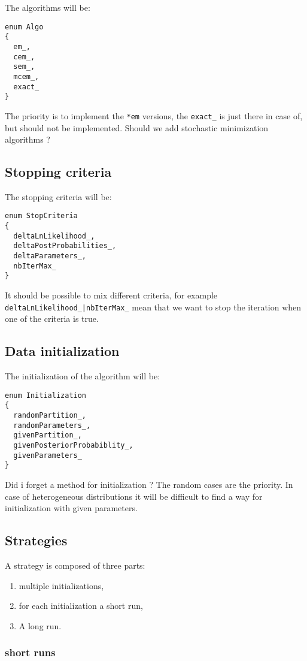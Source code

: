 \documentclass[a4paper,11pt]{article}
\begin{document}
The algorithms will be:
\begin{verbatim}
enum Algo
{
  em_,
  cem_,
  sem_,
  mcem_,
  exact_
}
\end{verbatim}

The priority is to implement the \verb+*em+ versions, the \verb+exact_+ is just there in case of, but
should not be implemented. Should we add stochastic minimization algorithms ?

\subsection{Stopping criteria}

The stopping criteria will be:
\begin{verbatim}
enum StopCriteria
{
  deltaLnLikelihood_,
  deltaPostProbabilities_,
  deltaParameters_,
  nbIterMax_
}
\end{verbatim}
It should be possible to mix different criteria, for example
\verb+deltaLnLikelihood_|nbIterMax_+ mean that we want to stop the iteration when one
of the criteria is true.

\subsection{Data initialization}

The initialization of the algorithm will be:
\begin{verbatim}
enum Initialization
{
  randomPartition_,
  randomParameters_,
  givenPartition_,
  givenPosteriorProbabiblity_,
  givenParameters_
}
\end{verbatim}

Did i forget a method for initialization ? The random cases are the priority.
In case of heterogeneous distributions it will be difficult to find a way for initialization with
given parameters.

\subsection{Strategies}

A strategy is composed of three parts:
\begin{enumerate}
  \item multiple initializations,
  \item for each initialization a short run,
  \item A long run.
\end{enumerate}

\subsubsection{short runs}
\end{document}
